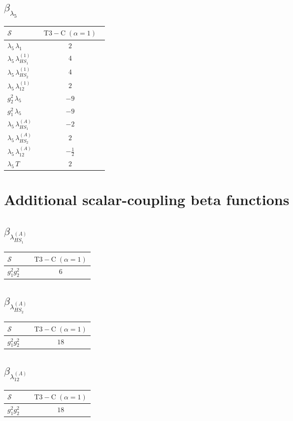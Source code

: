 \documentclass[9pt]{article}
\begin{document}
\subsection*{$ \beta_{\lambda_5} $}
\begin{longtable}{@{}p{0.31\linewidth}c@{}}
\toprule
$\mathcal{S}$ & $ \mathrm{T3-C}\;(\alpha=1) $ \\
\midrule
$ \lambda_5\,\lambda_1 $ & $ 2 $ \\
$ \lambda_5\,\lambda_{HS_1}^{(1)} $ & $ 4 $ \\
$ \lambda_5\,\lambda_{HS_2}^{(1)} $ & $ 4 $ \\
$ \lambda_5\,\lambda_{12}^{(1)} $ & $ 2 $ \\
$ g_2^2\,\lambda_5 $ & $ -9 $ \\
$ g_1^2\,\lambda_5 $ & $ -9 $ \\
$ \lambda_5\,\lambda_{HS_1}^{(A)} $ & $ -2 $ \\
$ \lambda_5\,\lambda_{HS_2}^{(A)} $ & $ 2 $ \\
$ \lambda_5\,\lambda_{12}^{(A)} $ & $ - \frac{1}{2} $ \\
$ \lambda_5\,T $ & $ 2 $ \\
\bottomrule
\end{longtable}
\section*{Additional scalar-coupling beta functions}
\subsection*{$ \beta_{\lambda_{HS_1}^{(A)}} $}
\begin{longtable}{@{}p{0.31\linewidth}c@{}}
\toprule
$\mathcal{S}$ & $ \mathrm{T3-C}\;(\alpha=1) $ \\
\midrule
$ g_1^2g_2^2 $ & $ 6 $ \\
\bottomrule
\end{longtable}
\subsection*{$ \beta_{\lambda_{HS_2}^{(A)}} $}
\begin{longtable}{@{}p{0.31\linewidth}c@{}}
\toprule
$\mathcal{S}$ & $ \mathrm{T3-C}\;(\alpha=1) $ \\
\midrule
$ g_1^2g_2^2 $ & $ 18 $ \\
\bottomrule
\end{longtable}
\subsection*{$ \beta_{\lambda_{12}^{(A)}} $}
\begin{longtable}{@{}p{0.31\linewidth}c@{}}
\toprule
$\mathcal{S}$ & $ \mathrm{T3-C}\;(\alpha=1) $ \\
\midrule
$ g_1^2g_2^2 $ & $ 18 $ \\
\bottomrule
\end{longtable}
\end{document}
